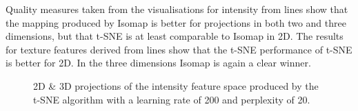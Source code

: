 Quality measures taken from the visualisations for intensity from lines show that the mapping produced by Isomap is better for projections in both two and three dimensions, but that t-SNE is at least comparable to Isomap in 2D. The results for texture features derived from lines show that the t-SNE performance of t-SNE is better for 2D. In the three dimensions Isomap is again a clear winner.



\clearpage
\begin{figure}[H]
	\centering
	\caption{2D \& 3D projections of the intensity feature space produced by the t-SNE algorithm with a learning rate of 200 and perplexity of 20.}\label{fig:intensity_SNE_mapping}
\end{figure}

